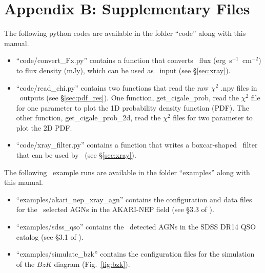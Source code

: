 \section*{Appendix B: Supplementary Files}\label{app:file}
The following {\sc python} codes are available in the folder ``code'' along with this manual. 
\begin{itemize}
    \item ``code/convert\_Fx.py'' contains a function that converts \xray\ flux (erg~s$^{-1}$~cm$^{-2}$) to flux density (mJy), which can be used as \xcig\ input (see \S\ref{sec:xray}).  
    \item ``code/read\_chi.py'' contains two functions that read the raw $\chi^2$ .npy files in \xcig\ outputs (see \S\ref{sec:pdf_res}). 
    One function, {\sc get\_cigale\_prob}, read the $\chi^2$ file for one parameter to plot the 1D probability density function (PDF). 
    The other function, {\sc get\_cigale\_prob\_2d}, read the $\chi^2$ files for two parameter to plot the 2D PDF. 
    \item ``code/xray\_filter.py'' contains a function that writes a boxcar-shaped \xray\ filter that can be used by \xcig\ (see \S\ref{sec:xray}).
\end{itemize}

The following \xcig\ example runs are available in the folder ``examples'' along with this manual. 
\begin{itemize}
    \item ``examples/akari\_nep\_xray\_agn'' contains the configuration and data files for the \xray\ selected AGNs in the \hbox{AKARI-NEP} field (see \S3.3 of \citealt{yang20}). 
    \item ``examples/sdss\_qso'' contains the \xray\ detected AGNs in the SDSS DR14 QSO catalog (see \S3.1 of \citealt{yang20}).
    \item ``examples/simulate\_bzk'' contains the configuration files for the simulation of the $BzK$ diagram (Fig.~\ref{fig:bzk}). 
\end{itemize}